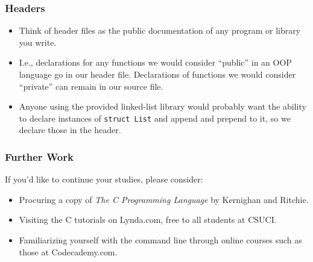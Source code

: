 \documentclass[pdf]{beamer}
\begin{document}
\begin{frame}
  \frametitle{Headers}

  \begin{itemize}
  \item Think of header files as the public documentation of any program or
    library you write. \pause
  \item I.e., declarations for any functions we would consider ``public'' in an
    OOP language go in our header file. Declarations of functions we would
    consider ``private'' can remain in our source file. \pause
  \item Anyone using the provided linked-list library would probably want the
    ability to declare instances of \texttt{struct List} and append and
    prepend to it, so we declare those in the header.
  \end{itemize}
\end{frame}

\begin{frame}
  \frametitle{Further Work}

  If you'd like to continue your studies, please consider:

  \begin{itemize}
  \item Procuring a copy of \emph{The C Programming Language} by Kernighan and
    Ritchie. \pause
  \item Visiting the C tutorials on Lynda.com, free to all students at CSUCI.
    \pause
  \item Familiarizing yourself with the command line through online courses such
    as those at Codecademy.com.
  \end{itemize}
\end{frame}
\end{document}
